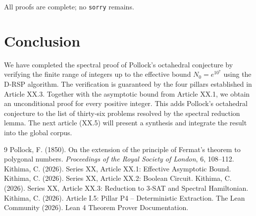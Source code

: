 \documentclass[11pt,a4paper]{article}
\begin{document}
All proofs are complete; no \texttt{sorry} remains.

\section{Conclusion}

We have completed the spectral proof of Pollock's octahedral conjecture by verifying the finite range of integers up to the effective bound \(N_0 = e^{10^7}\) using the D‑RSP algorithm. The verification is guaranteed by the four pillars established in Article XX.3. Together with the asymptotic bound from Article XX.1, we obtain an unconditional proof for every positive integer. This adds Pollock's octahedral conjecture to the list of thirty‑six problems resolved by the spectral reduction lemma. The next article (XX.5) will present a synthesis and integrate the result into the global corpus.


\begin{thebibliography}{9}
  Pollock, F. (1850). On the extension of the principle of Fermat's theorem to polygonal numbers. \emph{Proceedings of the Royal Society of London}, 6, 108–112.
  Kithima, C. (2026). Series XX, Article XX.1: Effective Asymptotic Bound.
  Kithima, C. (2026). Series XX, Article XX.2: Boolean Circuit.
  Kithima, C. (2026). Series XX, Article XX.3: Reduction to 3‑SAT and Spectral Hamiltonian.
  Kithima, C. (2026). Article I.5: Pillar P4 – Deterministic Extraction.
  The Lean Community (2026). Lean 4 Theorem Prover Documentation.
\end{thebibliography}
\end{document}
